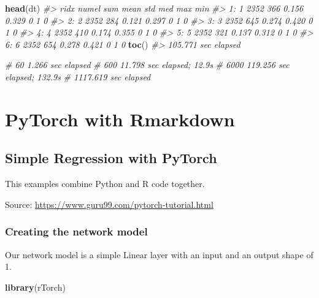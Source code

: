 \documentclass[]{book}
\newenvironment{Shaded}{\begin{snugshade}}{\end{snugshade}}
\newcommand{\CommentTok}[1]{\textcolor[rgb]{0.56,0.35,0.01}{\textit{#1}}}
\newcommand{\KeywordTok}[1]{\textcolor[rgb]{0.13,0.29,0.53}{\textbf{#1}}}
\newcommand{\NormalTok}[1]{#1}
\begin{document}
\begin{Shaded}
\begin{Highlighting}[]
\KeywordTok{head}\NormalTok{(dt)}
\CommentTok{#>    ridx numel sum  mean   std med max min}
\CommentTok{#> 1:    1  2352 366 0.156 0.329   0   1   0}
\CommentTok{#> 2:    2  2352 284 0.121 0.297   0   1   0}
\CommentTok{#> 3:    3  2352 645 0.274 0.420   0   1   0}
\CommentTok{#> 4:    4  2352 410 0.174 0.355   0   1   0}
\CommentTok{#> 5:    5  2352 321 0.137 0.312   0   1   0}
\CommentTok{#> 6:    6  2352 654 0.278 0.421   0   1   0}
\KeywordTok{toc}\NormalTok{()}
\CommentTok{#> 105.771 sec elapsed}

\CommentTok{#   60   1.266 sec elapsed}
\CommentTok{#  600   11.798 sec elapsed; 12.9s}
\CommentTok{# 6000  119.256 sec elapsed; 132.9s}
\CommentTok{# 1117.619 sec elapsed}
\end{Highlighting}
\end{Shaded}

\hypertarget{part-pytorch-with-rmarkdown}{%
\part{PyTorch with Rmarkdown}\label{part-pytorch-with-rmarkdown}}

\hypertarget{simple-regression-with-pytorch}{%
\chapter{Simple Regression with PyTorch}\label{simple-regression-with-pytorch}}

This examples combine Python and R code together.

Source: \url{https://www.guru99.com/pytorch-tutorial.html}

\hypertarget{creating-the-network-model}{%
\section{Creating the network model}\label{creating-the-network-model}}

Our network model is a simple Linear layer with an input and an output shape of 1.

\begin{Shaded}
\begin{Highlighting}[]
\KeywordTok{library}\NormalTok{(rTorch)}
\end{Highlighting}
\end{Shaded}
\end{document}
